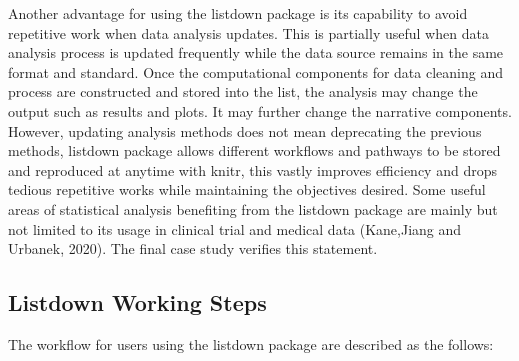 \documentclass[
]{article}
\begin{document}
Another advantage for using the listdown package is its capability to
avoid repetitive work when data analysis updates. This is partially
useful when data analysis process is updated frequently while the data
source remains in the same format and standard. Once the computational
components for data cleaning and process are constructed and stored into
the list, the analysis may change the output such as results and plots.
It may further change the narrative components. However, updating
analysis methods does not mean deprecating the previous methods,
listdown package allows different workflows and pathways to be stored
and reproduced at anytime with knitr, this vastly improves efficiency
and drops tedious repetitive works while maintaining the objectives
desired. Some useful areas of statistical analysis benefiting from the
listdown package are mainly but not limited to its usage in clinical
trial and medical data (Kane,Jiang and Urbanek, 2020). The final case
study verifies this statement.

\hypertarget{listdown-working-steps}{%
\subsection{Listdown Working Steps}\label{listdown-working-steps}}

The workflow for users using the listdown package are described as the
follows:
\end{document}
